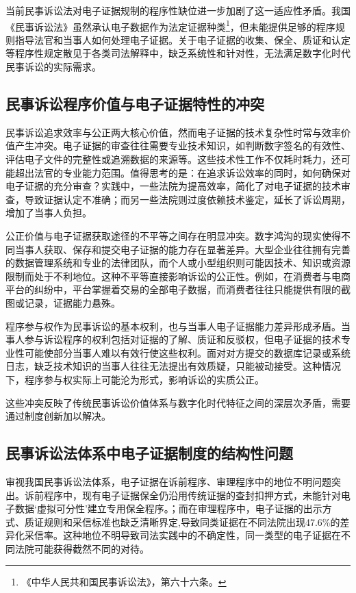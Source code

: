 当前民事诉讼法对电子证据规制的程序性缺位进一步加剧了这一适应性矛盾。我国《民事诉讼法》虽然承认电子数据作为法定证据种类\footnote{《中华人民共和国民事诉讼法》，第六十六条。}，但未能提供足够的程序规则指导法官和当事人如何处理电子证据。关于电子证据的收集、保全、质证和认定等程序性规定散见于各类司法解释中，缺乏系统性和针对性，无法满足数字化时代民事诉讼的实际需求。

\subsection{民事诉讼程序价值与电子证据特性的冲突}

民事诉讼追求效率与公正两大核心价值，然而电子证据的技术复杂性时常与效率价值产生冲突。电子证据的审查往往需要专业技术知识，如判断数字签名的有效性、评估电子文件的完整性或追溯数据的来源等。这些技术性工作不仅耗时耗力，还可能超出法官的专业能力范围。值得思考的是：在追求诉讼效率的同时，如何确保对电子证据的充分审查？实践中，一些法院为提高效率，简化了对电子证据的技术审查，导致证据认定不准确；而另一些法院则过度依赖技术鉴定，延长了诉讼周期，增加了当事人负担。

公正价值与电子证据获取途径的不平等之间存在明显冲突。数字鸿沟的现实使得不同当事人获取、保存和提交电子证据的能力存在显著差异。大型企业往往拥有完善的数据管理系统和专业的法律团队，而个人或小型组织则可能因技术、知识或资源限制而处于不利地位。这种不平等直接影响诉讼的公正性。例如，在消费者与电商平台的纠纷中，平台掌握着交易的全部电子数据，而消费者往往只能提供有限的截图或记录，证据能力悬殊。

程序参与权作为民事诉讼的基本权利，也与当事人电子证据能力差异形成矛盾。当事人参与诉讼程序的权利包括对证据的了解、质证和反驳权，但电子证据的技术专业性可能使部分当事人难以有效行使这些权利。面对对方提交的数据库记录或系统日志，缺乏技术知识的当事人往往无法提出有效质疑，只能被动接受。这种情况下，程序参与权实际上可能沦为形式，影响诉讼的实质公正。

这些冲突反映了传统民事诉讼价值体系与数字化时代特征之间的深层次矛盾，需要通过制度创新加以解决。

\subsection{民事诉讼法体系中电子证据制度的结构性问题}

审视我国民事诉讼法体系，电子证据在诉前程序、审理程序中的地位不明问题突出。诉前程序中，现有电子证据保全仍沿用传统证据的查封扣押方式，未能针对电子数据‘虚拟可分性’建立专用保全程序。；而在审理程序中，电子证据的出示方式、质证规则和采信标准也缺乏清晰界定,导致同类证据在不同法院出现47.6\%的差异化采信率。这种地位不明导致司法实践中的不确定性，同一类型的电子证据在不同法院可能获得截然不同的对待。

